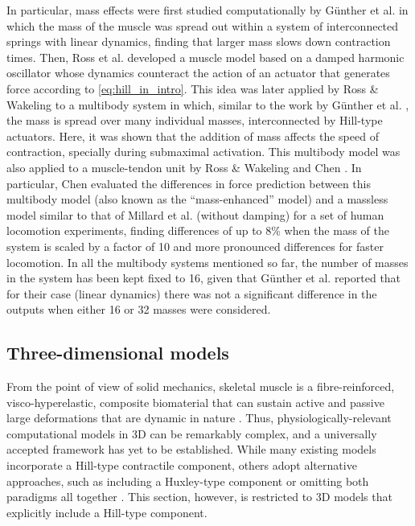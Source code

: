 \documentclass{sfuthesis}
\numberwithin{equation}{section}
\numberwithin{figure}{chapter}
\numberwithin{table}{chapter}
\theoremstyle{definition}
\begin{document}
In particular, mass effects were first studied computationally by G\"{u}nther et al. \cite{Gunther2012} in which the mass of the muscle was spread out within a system of interconnected springs with linear dynamics, finding that larger mass slows down contraction times. Then, Ross et al. \cite{Ross2018} developed a muscle model based on a damped harmonic oscillator whose dynamics counteract the action of an actuator that generates force according to \eqref{eq:hill_in_intro}. This idea was later applied by Ross \& Wakeling \cite{RossWakeling2016Multibody} to a multibody system in which, similar to the work by G\"{u}nther et al. \cite{Gunther2012}, the mass is spread over many individual masses, interconnected by Hill-type actuators. Here, it was shown that the addition of mass affects the speed of contraction, specially during submaximal activation. This multibody model was also applied to a muscle-tendon unit by Ross \& Wakeling \cite{Paper4_RossWakeling2021} and Chen \cite{EvanThesis}. In particular, Chen evaluated the differences in force prediction between this multibody model (also known as the ``mass-enhanced'' model) and a massless model similar to that of  Millard et al. \cite{MillardEtAl2013} (without damping) for a set of human locomotion experiments, finding differences of up to 8\% when the mass of the system is scaled by a factor of 10 and more pronounced differences for faster locomotion. In all the multibody systems mentioned so far, the number of masses in the system has been kept fixed to 16, given that G\"{u}nther et al. \cite{Gunther2012} reported that for their case (linear dynamics) there was not a significant difference in the outputs when either 16 or 32 masses were considered. 

\subsection{Three-dimensional models}

From the point of view of solid mechanics, skeletal muscle is a fibre-reinforced, visco-hyperelastic, composite biomaterial that can sustain active and passive large deformations that are dynamic in nature \cite{AlmonacidEtAl2022_SIAP_Paper,Paper3_RossEtAl2021,Paper1_WakelingEtAl2020}. Thus, physiologically-relevant computational models in 3D can be remarkably complex, and a universally accepted framework has yet to be established. While many existing models incorporate a Hill-type contractile component, others adopt alternative approaches, such as including a Huxley-type component \cite{Oomens2003} or omitting both paradigms all together \cite{Giantesio2024,OdegardEtAl2008}. This section, however, is restricted to 3D models that explicitly include a Hill-type component.
\end{document}
